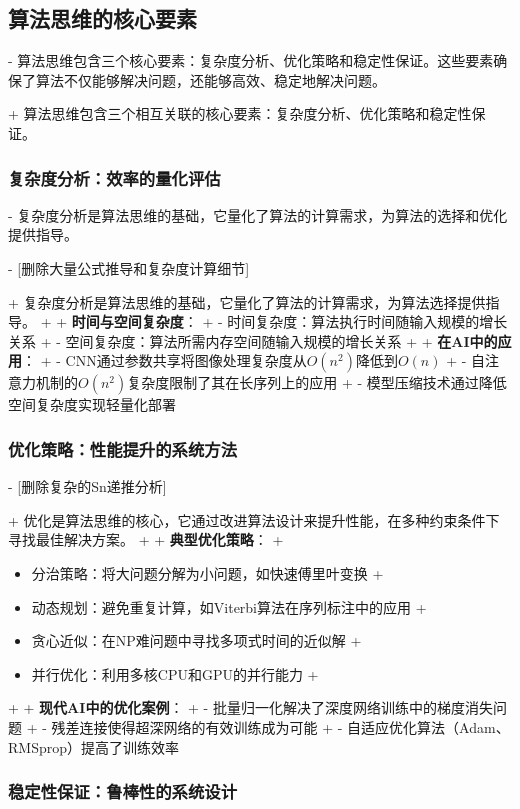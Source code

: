 \subsection{算法思维的核心要素}

- 算法思维包含三个核心要素：复杂度分析、优化策略和稳定性保证。这些要素确保了算法不仅能够解决问题，还能够高效、稳定地解决问题。

+ 算法思维包含三个相互关联的核心要素：复杂度分析、优化策略和稳定性保证。

\subsubsection{复杂度分析：效率的量化评估}

- 复杂度分析是算法思维的基础，它量化了算法的计算需求，为算法的选择和优化提供指导。

- [删除大量公式推导和复杂度计算细节]

+ 复杂度分析是算法思维的基础，它量化了算法的计算需求，为算法选择提供指导。
+
+ \textbf{时间与空间复杂度}：
+ - 时间复杂度：算法执行时间随输入规模的增长关系
+ - 空间复杂度：算法所需内存空间随输入规模的增长关系
+
+ \textbf{在AI中的应用}：
+ - CNN通过参数共享将图像处理复杂度从$O(n^2)$降低到$O(n)$
+ - 自注意力机制的$O(n^2)$复杂度限制了其在长序列上的应用
+ - 模型压缩技术通过降低空间复杂度实现轻量化部署

\subsubsection{优化策略：性能提升的系统方法}

- [删除复杂的Sn递推分析]

+ 优化是算法思维的核心，它通过改进算法设计来提升性能，在多种约束条件下寻找最佳解决方案。
+
+ \textbf{典型优化策略}：
+ \begin{itemize}
+ \item 分治策略：将大问题分解为小问题，如快速傅里叶变换
+ \item 动态规划：避免重复计算，如Viterbi算法在序列标注中的应用
+ \item 贪心近似：在NP难问题中寻找多项式时间的近似解
+ \item 并行优化：利用多核CPU和GPU的并行能力
+ \end{itemize}
+
+ \textbf{现代AI中的优化案例}：
+ - 批量归一化解决了深度网络训练中的梯度消失问题
+ - 残差连接使得超深网络的有效训练成为可能
+ - 自适应优化算法（Adam、RMSprop）提高了训练效率

\subsubsection{稳定性保证：鲁棒性的系统设计}

